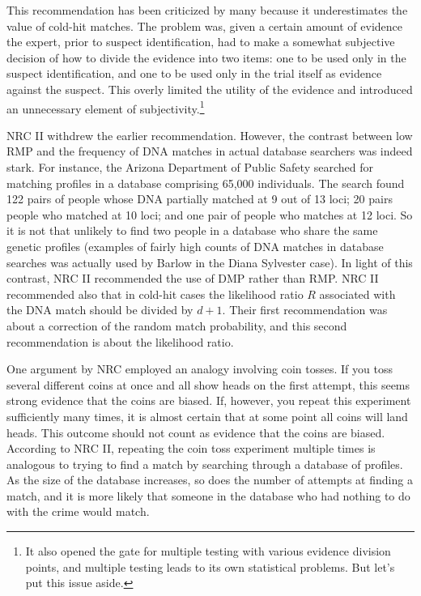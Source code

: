 \documentclass[
  10pt,
  dvipsnames,enabledeprecatedfontcommands]{scrartcl}
\begin{document}
This recommendation has been criticized by many because it
underestimates the value of cold-hit matches. The problem was, given a
certain amount of evidence the expert, prior to suspect identification,
had to make a somewhat subjective decision of how to divide the evidence
into two items: one to be used only in the suspect identification, and
one to be used only in the trial itself as evidence against the suspect.
This overly limited the utility of the evidence and introduced an
unnecessary element of
subjectivity.\footnote{It also opened the gate for multiple testing with various evidence division points, and multiple testing leads to its own statistical problems. But let's put this issue aside.}

NRC II withdrew the earlier recommendation. However, the contrast
between low RMP and the frequency of DNA matches in actual database
searchers was indeed stark. For instance, the Arizona Department of
Public Safety searched for matching profiles in a database comprising
65,000 individuals. The search found 122 pairs of people whose DNA
partially matched at 9 out of 13 loci; 20 pairs people who matched at 10
loci; and one pair of people who matches at 12 loci. So it is not that
unlikely to find two people in a database who share the same genetic
profiles (examples of fairly high counts of DNA matches in database
searches was actually used by Barlow in the Diana Sylvester case). In
light of this contrast, NRC II recommended the use of DMP rather than
RMP. NRC II recommended also that in cold-hit cases the likelihood ratio
\(R\) associated with the DNA match should be divided by \(d+1\). Their
first recommendation was about a correction of the random match
probability, and this second recommendation is about the likelihood
ratio.

One argument by NRC employed an analogy involving coin tosses. If you
toss several different coins at once and all show heads on the first
attempt, this seems strong evidence that the coins are biased. If,
however, you repeat this experiment sufficiently many times, it is
almost certain that at some point all coins will land heads. This
outcome should not count as evidence that the coins are biased.
According to NRC II, repeating the coin toss experiment multiple times
is analogous to trying to find a match by searching through a database
of profiles. As the size of the database increases, so does the number
of attempts at finding a match, and it is more likely that someone in
the database who had nothing to do with the crime would match.
\end{document}
